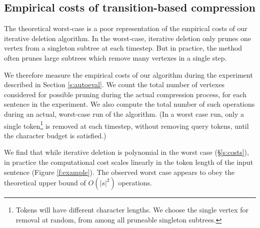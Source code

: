 \documentclass[11pt,a4paper]{article}
\begin{document}
\subsection{Empirical costs of transition-based compression}\label{s:empiricalcost}

The theoretical worst-case is a poor representation of the empirical costs of our iterative deletion algorithm. In the worst-case, iterative deletion only prunes one vertex from a singleton subtree at each timestep. But in practice, the method often prunes large subtrees which remove many vertexes in a single step. 


We therefore measure the empirical costs of our algorithm during the experiment described in Section \ref{s:autoeval}. We count the total number of vertexes considered for possible pruning during the actual compression process, for each sentence in the experiment. We also compute the total number of such operations during an actual, worst-case run of the algorithm. (In a worst case run, only a single token\footnote{Tokens will have different character lengths. We choose the single vertex for removal at random, from among all pruneable singleton subtrees.} is removed at each timestep, without removing query tokens, until the character budget is satisfied.) 

We find that while iterative deletion is polynomial in the worst case (\S\ref{s:costs}), in practice the computational cost scales linearly in the token length of the input sentence (Figure \ref{f:example}). The observed worst case appears to obey the theoretical upper bound of $O(|s|^2)$ operations.
\end{document}
